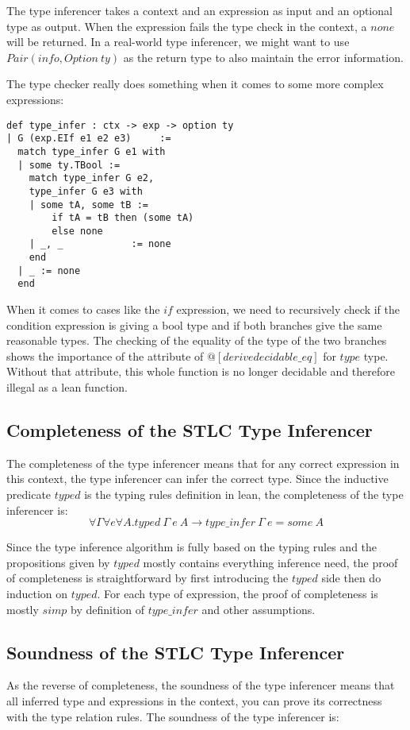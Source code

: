 \documentclass[conference]{IEEEtran}
\begin{document}
The type inferencer takes a context and an expression as input and an
optional type as output. When the expression fails the type check in
the context, a $none$ will be returned. In a real-world type inferencer,
we might want to use $Pair(info, Option\ ty)$ as the return type to also
maintain the error information.

The type checker really does something when it comes to some more complex
expressions:

\begin{lstlisting}
def type_infer : ctx -> exp -> option ty
| G (exp.EIf e1 e2 e3)     :=
  match type_infer G e1 with
  | some ty.TBool :=
    match type_infer G e2, 
    type_infer G e3 with
    | some tA, some tB := 
        if tA = tB then (some tA) 
        else none
    | _, _            := none
    end
  | _ := none
  end
\end{lstlisting}
When it comes to cases like the $if$ expression, we need to recursively check if the
condition expression is giving a bool type and if both branches give the same
reasonable types. The checking of the equality of the type of the two
branches shows the importance of the attribute of $@[derive decidable\_eq]$
for $type$ type. Without that attribute, this whole function is no longer
decidable and therefore illegal as a lean function.

\subsection{Completeness of the STLC Type Inferencer}
The completeness of the type inferencer means that for any correct expression
in this context, the type inferencer can infer the correct type. Since
the inductive predicate $typed$ is the typing rules definition in lean,
the completeness of the type inferencer is:
\begin{equation}
	\forall \Gamma\forall e\forall A.typed\ \Gamma\ e\ A \to type\_infer\ \Gamma \ e = some\ A
	\label{eq:cmp}
\end{equation}

Since the type inference algorithm is fully based on the typing rules and
the propositions given by $typed$ mostly contains everything inference need,
the proof of completeness is straightforward by first introducing the $typed$
side then do induction on $typed$. For each type of expression, the proof
of completeness is mostly $simp$ by definition of $type\_infer$ and other
assumptions.

\subsection{Soundness of the STLC Type Inferencer}
As the reverse of completeness,
the soundness of the type inferencer means that all inferred type and
expressions in the context, you can prove its correctness with the type
relation rules. The soundness of the type inferencer is:
\end{document}
